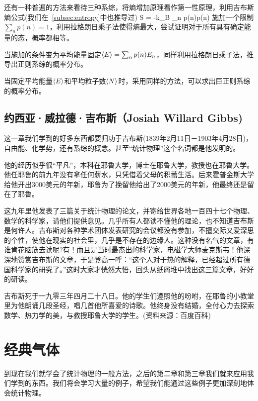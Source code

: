 \documentclass[11pt]{ctexart}
\begin{document}
还有一种普遍的方法来看待三种系综，将熵增加原理看作第一性原理，利用吉布斯熵公式(我们在~\ref{subsec:entropy}中也推导过)
\be
S = -k_B \sum_n p(n)\ln p(n)
\ee
施加一个限制$\sum_np(n) =1$，利用拉格朗日乘子法使得熵最大，尝试证明对于所有具有确定能量的态，概率都相等。

当施加的条件变为平均能量固定$\langle E \rangle = \sum_n p(n)E_n$，同样利用拉格朗日乘子法，推导出正则系综的概率分布。

当固定平均能量$\langle E \rangle$和平均粒子数$\langle N \rangle$时，采用同样的方法，可以求出巨正则系综的概率分布。
\newpage
\subsection{约西亚·威拉德·吉布斯（Josiah Willard Gibbs)}
这一章我们学到的好多东西都要归功于吉布斯(1839年2月11日－1903年4月28日)，自由能、化学势，还有系综的概念。甚至“统计物理”这个名词都是他发明的。

他的经历似乎很“平凡”，本科在耶鲁大学，博士在耶鲁大学，教授也在耶鲁大学。他任耶鲁的前九年没有拿任何薪水，只凭借着父母的积蓄生活。后来霍普金斯大学给他开出3000美元的年新，耶鲁为了挽留他给出了2000美元的年新，他最终还是留在了耶鲁。

这九年里他发表了三篇关于统计物理的论文，并寄给世界各地一百四十七个物理、数学的科学家，请他们提供意见。几乎所有人都读不懂他的理论，也不知道吉布斯是何许人。吉布斯对各种学术团体发表研究的会议都没有参加，不擅交际又爱深思的个性，使他在现实的社会里，几乎是不存在的边缘人。这种没有名气的文章，有谁肯花脑筋去读呢?有！而且是当时最杰出的科学家，电磁学大师麦克斯韦！他深深地赞赏吉布斯的文章，于是登高一呼：“这个人对于热的解释，已经超过所有德国科学家的研究了。”这时大家才恍然大悟，回头从纸屑堆中找出这三篇文章，好好的研读。

吉布斯死于一九零三年四月二十八日。他的学生们遵照他的吩咐，在耶鲁的小教堂里为他朗诵几段圣经，唱几首他所喜爱的诗歌。他终身没有结婚，全付心力去探索数学、热力学的美，与教授耶鲁大学的学生。(资料来源：百度百科)
\newpage
\section{经典气体}
到现在我们就学会了统计物理的一般方法，之后的第二章和第三章我们就来应用我们学到的东西。我们将会学习大量的例子，希望我们能通过这些例子更加深刻地体会统计物理。
\end{document}
